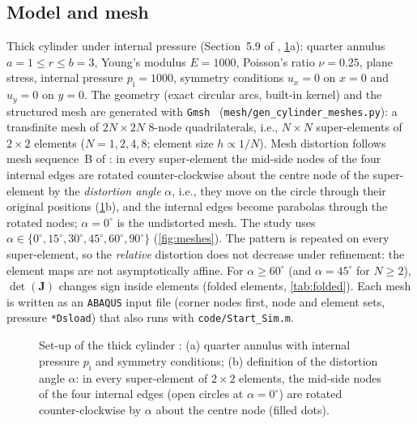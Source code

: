\subsection{Model and mesh}\label{sec:mesh}
Thick cylinder under internal pressure (Section~5.9 of
\citep{Rajendran2010technique}, \cref{fig:setup}a): quarter annulus $a=1\le r\le b=3$,
Young's modulus $E=1000$, Poisson's ratio $\nu=0.25$, plane stress, internal pressure $p_{\mathrm i}=1000$, symmetry conditions
$u_x=0$ on $x=0$ and $u_y=0$ on $y=0$. The geometry (exact circular arcs, built-in
kernel) and the structured mesh are generated with \texttt{Gmsh}~\cite{Geuzaine2009Gmsh}
(\texttt{mesh/gen\_cylinder\_meshes.py}): a transfinite mesh of $2N\times2N$
8-node quadrilaterals, i.e., $N\times N$ super-elements of $2\times2$ elements
($N=1,2,4,8$; element size $h\propto1/N$). Mesh distortion follows mesh
sequence~B of \citep[Fig.~19]{Rajendran2010technique}: in every super-element the
mid-side nodes of the four internal edges are rotated counter-clockwise about the
centre node of the super-element by the \emph{distortion angle} $\alpha$, i.e., they move on
the circle through their original positions (\cref{fig:setup}b), and the internal edges become
parabolas through the rotated nodes; $\alpha=0^\circ$ is the undistorted mesh. The study uses
$\alpha\in\{0^\circ,15^\circ,30^\circ,45^\circ,60^\circ,90^\circ\}$ (\cref{fig:meshes}). The pattern is repeated on every super-element, so the
\emph{relative} distortion does not decrease under refinement: the element maps are
not asymptotically affine. For $\alpha\ge60^\circ$ (and $\alpha=45^\circ$ for $N\ge2$),
$\det(\bm J)$ changes sign inside elements (folded elements, \cref{tab:folded}). Each mesh is written as
an \texttt{ABAQUS} input file (corner nodes first, node and element sets, pressure
\texttt{*Dsload}) that also runs with \texttt{code/Start\_Sim.m}.

\begin{figure}[t]
  \centering
  
  \caption{Set-up of the thick cylinder \citep[Sec.~5.9]{Rajendran2010technique}: (a) quarter
    annulus with internal pressure $p_{\mathrm i}$ and symmetry conditions; (b) definition of the
    distortion angle $\alpha$: in every super-element of $2\times2$ elements, the mid-side nodes
    of the four internal edges (open circles at $\alpha=0^\circ$) are rotated counter-clockwise
    by $\alpha$ about the centre node (filled dots).}
  \label{fig:setup}
\end{figure}

